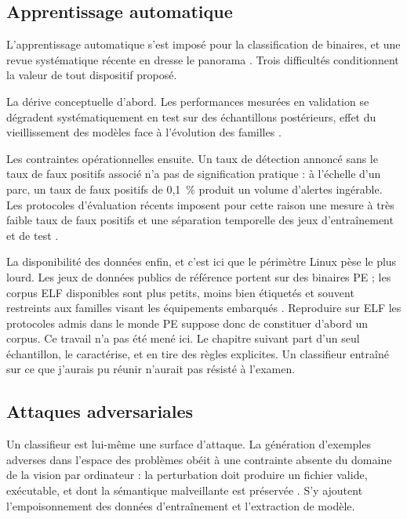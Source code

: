 \subsection{Apprentissage automatique}

L'apprentissage automatique s'est imposé pour la classification de binaires, et une revue systématique récente en dresse le panorama \cite{gaber2024}. Trois difficultés conditionnent la valeur de tout dispositif proposé.

La dérive conceptuelle d'abord. Les performances mesurées en validation se dégradent systématiquement en test sur des échantillons postérieurs, effet du vieillissement des modèles face à l'évolution des familles \cite{bodmas}.

Les contraintes opérationnelles ensuite. Un taux de détection annoncé sans le taux de faux positifs associé n'a pas de signification pratique : à l'échelle d'un parc, un taux de faux positifs de 0,1~\% produit un volume d'alertes ingérable. Les protocoles d'évaluation récents imposent pour cette raison une mesure à très faible taux de faux positifs et une séparation temporelle des jeux d'entraînement et de test \cite{ember2024}.

La disponibilité des données enfin, et c'est ici que le périmètre Linux pèse le plus lourd. Les jeux de données publics de référence portent sur des binaires PE ; les corpus ELF disponibles sont plus petits, moins bien étiquetés et souvent restreints aux familles visant les équipements embarqués \cite{crossArchSurvey}. Reproduire sur ELF les protocoles admis dans le monde PE suppose donc de constituer d'abord un corpus. Ce travail n'a pas été mené ici. Le chapitre suivant part d'un seul échantillon, le caractérise, et en tire des règles explicites. Un classifieur entraîné sur ce que j'aurais pu réunir n'aurait pas résisté à l'examen.

\subsection{Attaques adversariales}

Un classifieur est lui-même une surface d'attaque. La génération d'exemples adverses dans l'espace des problèmes obéit à une contrainte absente du domaine de la vision par ordinateur : la perturbation doit produire un fichier valide, exécutable, et dont la sémantique malveillante est préservée \cite{pierazzi2020}. S'y ajoutent l'empoisonnement des données d'entraînement et l'extraction de modèle.

